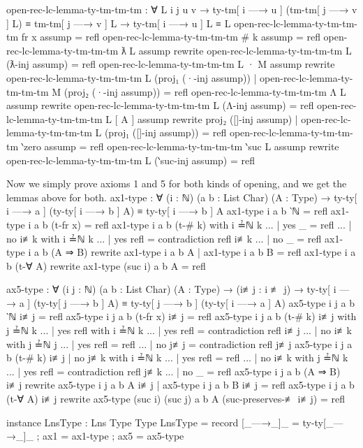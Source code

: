 \documentclass[logo,bsc,singlespacing,parskip,online]{infthesis}
\renewenvironment{code}{\mintedcopy[breaklines,breaksymbolleft=\;]{agda}}{\endmintedcopy}
\begin{document}
\begin{code}
  open-rec-lc-lemma-ty-tm-tm-tm : ∀ {L i j u v}
    → ty-tm[ i —→ u ] (tm-tm[ j —→ v ] L) ≡ tm-tm[ j —→ v ] L
    → ty-tm[ i —→ u ] L ≡ L
  open-rec-lc-lemma-ty-tm-tm-tm {fr x} assump = refl
  open-rec-lc-lemma-ty-tm-tm-tm {# k} assump = refl
  open-rec-lc-lemma-ty-tm-tm-tm {ƛ L} assump rewrite
    open-rec-lc-lemma-ty-tm-tm-tm {L} (ƛ-inj assump) = refl
  open-rec-lc-lemma-ty-tm-tm-tm {L · M} assump rewrite
      open-rec-lc-lemma-ty-tm-tm-tm {L} (proj₁ (·-inj assump))
    | open-rec-lc-lemma-ty-tm-tm-tm {M} (proj₂ (·-inj assump))
    = refl
  open-rec-lc-lemma-ty-tm-tm-tm {Λ L} assump rewrite
    open-rec-lc-lemma-ty-tm-tm-tm {L} (Λ-inj assump) = refl
  open-rec-lc-lemma-ty-tm-tm-tm {L [ A ]} assump rewrite
      proj₂ ([]-inj assump)
    | open-rec-lc-lemma-ty-tm-tm-tm {L} (proj₁ ([]-inj assump))
    = refl
  open-rec-lc-lemma-ty-tm-tm-tm {‵zero} assump = refl
  open-rec-lc-lemma-ty-tm-tm-tm {‵suc L} assump rewrite
    open-rec-lc-lemma-ty-tm-tm-tm {L} (‵suc-inj assump) = refl
\end{code}

Now we simply prove axioms 1 and 5 for both kinds of opening, and we get the lemmas above for both.
\begin{code}
  ax1-type : ∀ (i : ℕ) (a b : List Char) (A : Type)
    → ty-ty[ i —→ a ] (ty-ty[ i —→ b ] A) ≡ ty-ty[ i —→ b ] A
  ax1-type i a b ‵ℕ = refl
  ax1-type i a b (t-fr x) = refl
  ax1-type i a b (t-# k) with i ≟ℕ k
  ... | yes _   = refl
  ... | no  i≢k with i ≟ℕ k
  ... | yes refl = contradiction refl i≢k
  ... | no  _    = refl
  ax1-type i a b (A ⇒ B)
    rewrite ax1-type i a b A | ax1-type i a b B = refl
  ax1-type i a b (t-∀ A) rewrite ax1-type (suc i) a b A = refl

  ax5-type : ∀ (i j : ℕ) (a b : List Char) (A : Type)
    → (i≢j : i ≢ j)
    → ty-ty[ i —→ a ] (ty-ty[ j —→ b ] A)
      ≡ ty-ty[ j —→ b ] (ty-ty[ i —→ a ] A)
  ax5-type i j a b ‵ℕ i≢j = refl
  ax5-type i j a b (t-fr x) i≢j = refl
  ax5-type i j a b (t-# k) i≢j with j ≟ℕ k
  ... | yes refl with i ≟ℕ k
  ... |   yes refl = contradiction refl i≢j
  ... |   no  i≢k  with j ≟ℕ j
  ... |     yes refl = refl
  ... |     no  j≢j  = contradiction refl j≢j
  ax5-type i j a b (t-# k) i≢j | no j≢k with i ≟ℕ k
  ... | yes refl = refl
  ... | no  i≢k  with j ≟ℕ k
  ... |   yes refl = contradiction refl j≢k
  ... |   no  _    = refl
  ax5-type i j a b (A ⇒ B) i≢j
    rewrite ax5-type i j a b A i≢j | ax5-type i j a b B i≢j = refl
  ax5-type i j a b (t-∀ A) i≢j
    rewrite ax5-type (suc i) (suc j) a b A (suc-preserves-≢ i≢j)
          = refl
  
  instance
    LnsType : Lns Type Type
    LnsType = record
      { [_—→_]_ = ty-ty[_—→_]_
      ; ax1 = ax1-type
      ; ax5 = ax5-type }
\end{code}
\end{document}
